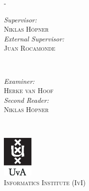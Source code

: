 \documentclass[../main.tex]{subfiles}
\begin{document}
\begin{titlingpage}
\begin{adjustwidth}{\unitlength}{-\unitlength}
    \begin{minipage}[t]{0.4\textwidth}
        \begin{flushleft} \large
            \emph{Supervisor:} \\
            \textsc{Niklas Höpner} \\
            \vspace{0.5cm}
            \emph{External Supervisor:} \\
            \textsc{Juan Rocamonde}
        \end{flushleft}
    \end{minipage}
    ~
    \begin{minipage}[t]{0.4\textwidth}
        \begin{flushright} \large
            \emph{Examiner:} \\
            \textsc{Herke van Hoof} \\
            \vspace{0.5cm}
            \emph{Second Reader:} \\
            \textsc{Niklas Höpner}
        \end{flushright}
    \end{minipage}\\[2cm]

    \vfill %

    \includegraphics[width=1.5cm]{logos/uvalogo_tag_p.eps}\\[0.5cm]
    \textsc{\large Informatics Institute (IvI)}\\[1.0cm] %

  \end{adjustwidth}

\end{titlingpage}
\end{document}
